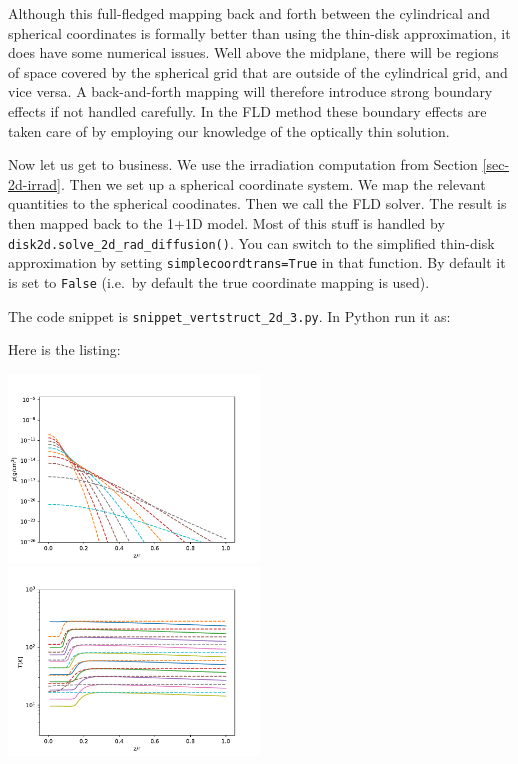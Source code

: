 \documentclass{book}
\newcommand{\code}[1]{{\small\tt #1}}
\begin{document}
Although this full-fledged mapping back and forth between the cylindrical and
spherical coordinates is formally better than using the thin-disk approximation,
it does have some numerical issues. Well above the midplane, there will be
regions of space covered by the spherical grid that are outside of the
cylindrical grid, and vice versa. A back-and-forth mapping will therefore
introduce strong boundary effects if not handled carefully. In the FLD method
these boundary effects are taken care of by employing our knowledge of the
optically thin solution. 

Now let us get to business. We use the irradiation computation from Section
\ref{sec-2d-irrad}. Then we set up a spherical coordinate system. We map the
relevant quantities to the spherical coodinates. Then we call the FLD
solver. The result is then mapped back to the 1+1D model. Most of this
stuff is handled by \code{disk2d.solve\_2d\_rad\_diffusion()}. You can
switch to the simplified thin-disk approximation by setting
\code{simplecoordtrans=True} in that function. By default it is set to
\code{False} (i.e.\ by default the true coordinate mapping is used).

The code snippet is
\code{snippet\_vertstruct\_2d\_3.py}. In Python run it as:
\begin{codebox}
\end{codebox}
Here is the listing:

\centerline{\includegraphics[width=0.5\textwidth]{../snippets/fig_snippet_vertstruct_2d_3_1.pdf}
\includegraphics[width=0.5\textwidth]{../snippets/fig_snippet_vertstruct_2d_3_2.pdf}}
\end{document}
